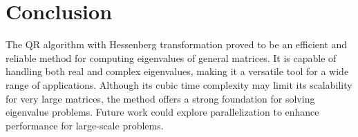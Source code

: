 \documentclass{article}
\begin{document}
\section{Conclusion}
The QR algorithm with Hessenberg transformation proved to be an efficient and reliable method for computing eigenvalues of general matrices. It is capable of handling both real and complex eigenvalues, making it a versatile tool for a wide range of applications. Although its cubic time complexity may limit its scalability for very large matrices, the method offers a strong foundation for solving eigenvalue problems. Future work could explore parallelization to enhance performance for large-scale problems.
\end{document}

